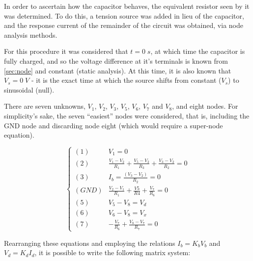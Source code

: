 In order to ascertain how the capacitor behaves, the equivalent resistor seen by it was determined. To do this, a tension source was added in lieu of the capacitor, and the response current of the remainder of the circuit was obtained, via node analysis methods.

For this procedure it was considered that $t=0\;s$, at which time the capacitor is fully charged, and so the voltage difference at it's terminals is known from \ref{sec:node} and constant (static analysis). At this time, it is also known that $V_s=0\;V$ - it is the exact time at which the source shifts from constant ($V_s$) to sinusoidal (null).


There are seven unknowns, $V_1$, $V_2$, $V_3$, $V_5$, $V_6$, $V_7$ and $V_8$, and eight nodes. For simplicity's sake, the seven ``easiest'' nodes were considered, that is, including the GND node and discarding node eight (which would require a super-node equation).

\begin{equation}
  \begin{cases}
    (1) & V_1=0 \\
    (2) & \frac{V_1-V_2}{R_1} + \frac{V_5-V_2}{R_3} + \frac{V_3-V_2}{R_2} = 0 \\
    (3) & I_b = \frac{(V_3-V_2)}{R_2} = 0 \\
    (GND) & \frac{V_2-V_1}{R_1} + \frac{V5}{R4} + \frac{V_7}{R_6} = 0 \\
    (5) & V_5-V_8 = V_d \\
    (6) & V_6-V_8 = V_x \\
    (7) & -\frac{V_7}{R_6} + \frac{V_8-V_7}{R_7} = 0
  \end{cases}
\end{equation}

Rearranging these equations and employing the relations $I_b = K_bV_b$ and $V_d = K_dI_d$, it is possible to write the following matrix system:

